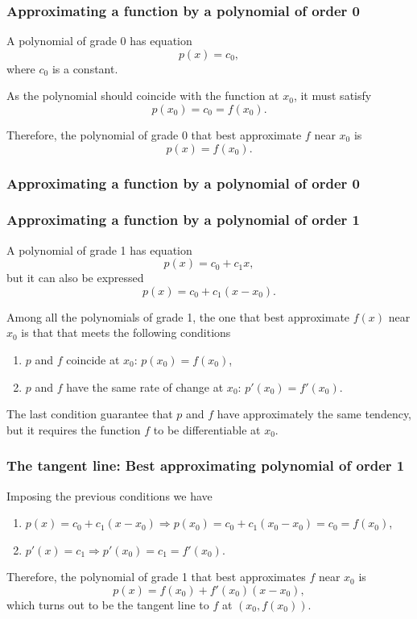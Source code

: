 \begin{frame}
\frametitle{Approximating a function by a polynomial of order 0}
A polynomial of grade 0 has equation
\[
p(x) = c_0,
\]
where $c_0$ is a constant.

As the polynomial should coincide with the function at $x_0$, it must satisfy
\[p(x_0) = c_0 = f(x_0).\]

Therefore, the polynomial of grade 0 that best approximate $f$ near $x_0$ is
\[p(x) = f(x_0).\]
\end{frame}


\begin{frame}
\frametitle{Approximating a function by a polynomial of order 0}
\begin{center}

\end{center}
\end{frame}


\begin{frame}
\frametitle{Approximating a function by a polynomial of order 1}
A polynomial of grade 1 has equation
\[
p(x) = c_0+c_1x,
\]
but it can also be expressed 
\[
p(x) = c_0+c_1(x-x_0).
\]

Among all the polynomials of grade 1, the one that best approximate $f(x)$ near $x_0$ is that that meets the following conditions

\begin{enumerate}
\item $p$ and $f$ coincide at $x_0$: $p(x_0) = f(x_0)$,
\item $p$ and $f$ have the same rate of change at $x_0$: $p'(x_0) = f'(x_0)$.
\end{enumerate}

The last condition guarantee that $p$ and $f$ have approximately the same tendency, but it requires the function $f$ to be differentiable at $x_0$.
\end{frame}


\begin{frame}
\frametitle{The tangent line: Best approximating polynomial of order 1}
Imposing the previous conditions we have
\begin{enumerate}
\item $p(x)=c_0+c_1(x-x_0) \Rightarrow p(x_0)=c_0+c_1(x_0-x_0)=c_0=f(x_0)$,
\item $p'(x)=c_1 \Rightarrow p'(x_0)=c_1=f'(x_0)$.
\end{enumerate}

Therefore, the polynomial of grade 1 that best approximates $f$ near $x_0$ is
\[
p(x) = f(x_0)+f '(x_0)(x-x_0),
\]
which turns out to be the tangent line to $f$ at $(x_0,f(x_0))$.
\end{frame}



